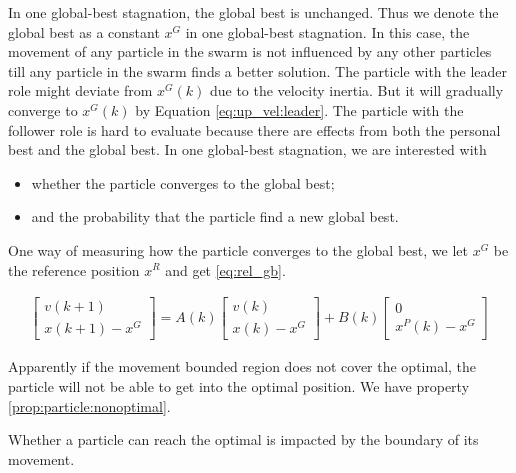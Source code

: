 In one global-best stagnation, the global best is unchanged.
Thus we denote the global best as a constant $ x^{G} $ in one global-best stagnation.
In this case, the movement of any particle in the swarm is not influenced by any other particles till any particle in the swarm finds a better solution.
The particle with the leader role might deviate from $ x^{G}(k) $ due to the velocity inertia.
But it will gradually converge to $ x^{G}(k) $ by Equation \eqref{eq:up_vel:leader}.
The particle with the follower role is hard to evaluate because there are effects from both the personal best and the global best.
In one global-best stagnation, we are interested with 
\begin{itemize}
\item whether the particle converges to the global best;
\item and the probability that the particle find a new global best.
\end{itemize}

One way of measuring how the particle converges to the global best, we let $ x^{G} $ be the reference position $ x^{R} $ and get \eqref{eq:rel_gb}.

\begin{equation}
\label{eq:rel_gb}
\begin{aligned}
\begin{bmatrix}
v(k+1) \\
x(k+1) - x^{G}
\end{bmatrix}
 = A(k) 
\begin{bmatrix}
v(k) \\
x(k) - x^{G}
\end{bmatrix}
+ B(k) 
\begin{bmatrix}
0 \\
x^{P}(k) - x^{G}
\end{bmatrix}
\end{aligned}
\end{equation}

Apparently if the movement bounded region does not cover the optimal, the particle will not be able to get into the optimal position.
We have property \ref{prop:particle:nonoptimal}.

\begin{myprop}
\label{prop:particle:nonoptimal}
Whether a particle can reach the optimal is impacted by the boundary of its movement.
\end{myprop}

